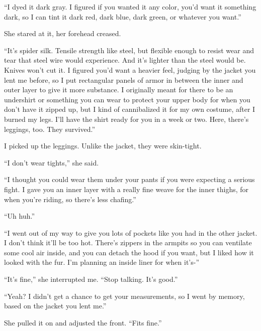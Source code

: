 ``I dyed it dark gray.  I figured if you wanted it any color, you'd want it something dark, so I can tint it dark red, dark blue, dark green, or whatever you want.''



She stared at it, her forehead creased.



``It's spider silk.  Tensile strength like steel, but flexible enough to resist wear and tear that steel wire would experience.  And it's lighter than the steel would be.  Knives won't cut it.  I figured you'd want a heavier feel, judging by the jacket you lent me before, so I put rectangular panels of armor in between the inner and outer layer to give it more substance.  I originally meant for there to be an undershirt or something you can wear to protect your upper body for when you don't have it zipped up, but I kind of cannibalized it for my own costume, after I burned my legs.  I'll have the shirt ready for you in a week or two.  Here, there's leggings, too.  They survived.''



I picked up the leggings.  Unlike the jacket, they were skin-tight.



``I don't wear tights,'' she said.



``I thought you could wear them under your pants if you were expecting a serious fight.  I gave you an inner layer with a really fine weave for the inner thighs, for when you're riding, so there's less chafing.''



``Uh huh.''



``I went out of my way to give you lots of pockets like you had in the other jacket.  I don't think it'll be too hot.  There's zippers in the armpits so you can ventilate some cool air inside, and you can detach the hood if you want, but I liked how it looked with the fur.  I'm planning an inside liner for when it's-''



``It's fine,'' she interrupted me.  ``Stop talking.  It's good.''



``Yeah?  I didn't get a chance to get your measurements, so I went by memory, based on the jacket you lent me.''



She pulled it on and adjusted the front.  ``Fits fine.''



